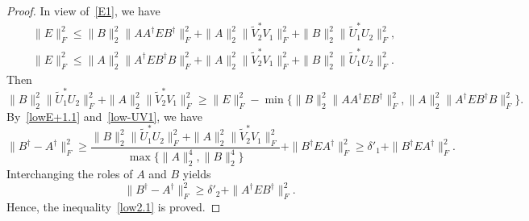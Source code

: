 \documentclass[11pt]{article}
\begin{document}
\begin{proof}
In view of~\eqref{E1}, we have
\begin{align*}
&\|E\|_{F}^{2}\leq\|B\|_{2}^{2}\|AA^{\dagger}EB^{\dagger}\|_{F}^{2}+\|A\|_{2}^{2}\|\widetilde{V}_{2}^{\ast}V_{1}\|_{F}^{2}+\|B\|_{2}^{2}\|\widetilde{U}_{1}^{\ast}U_{2}\|_{F}^{2},\\
&\|E\|_{F}^{2}\leq\|A\|_{2}^{2}\|A^{\dagger}EB^{\dagger}B\|_{F}^{2}+\|A\|_{2}^{2}\|\widetilde{V}_{2}^{\ast}V_{1}\|_{F}^{2}+\|B\|_{2}^{2}\|\widetilde{U}_{1}^{\ast}U_{2}\|_{F}^{2}.
\end{align*}
Then
\begin{equation}\label{low-UV1}
\|B\|_{2}^{2}\|\widetilde{U}_{1}^{\ast}U_{2}\|_{F}^{2}+\|A\|_{2}^{2}\|\widetilde{V}_{2}^{\ast}V_{1}\|_{F}^{2}\geq\|E\|_{F}^{2}-\min\big\{\|B\|_{2}^{2}\|AA^{\dagger}EB^{\dagger}\|_{F}^{2},\|A\|_{2}^{2}\|A^{\dagger}EB^{\dagger}B\|_{F}^{2}\big\}.
\end{equation}
By~\eqref{lowE+1.1} and~\eqref{low-UV1}, we have
\begin{displaymath}
\|B^{\dagger}-A^{\dagger}\|_{F}^{2}\geq\frac{\|B\|_{2}^{2}\|\widetilde{U}_{1}^{\ast}U_{2}\|_{F}^{2}+\|A\|_{2}^{2}\|\widetilde{V}_{2}^{\ast}V_{1}\|_{F}^{2}}{\max\big\{\|A\|_{2}^{4},\|B\|_{2}^{4}\big\}}+\|B^{\dagger}EA^{\dagger}\|_{F}^{2}\geq\delta'_{1}+\|B^{\dagger}EA^{\dagger}\|_{F}^{2}.
\end{displaymath}
Interchanging the roles of $A$ and $B$ yields
\begin{displaymath}
\|B^{\dagger}-A^{\dagger}\|_{F}^{2}\geq\delta'_{2}+\|A^{\dagger}EB^{\dagger}\|_{F}^{2}.
\end{displaymath}
Hence, the inequality~\eqref{low2.1} is proved.


\end{proof}
\end{document}
